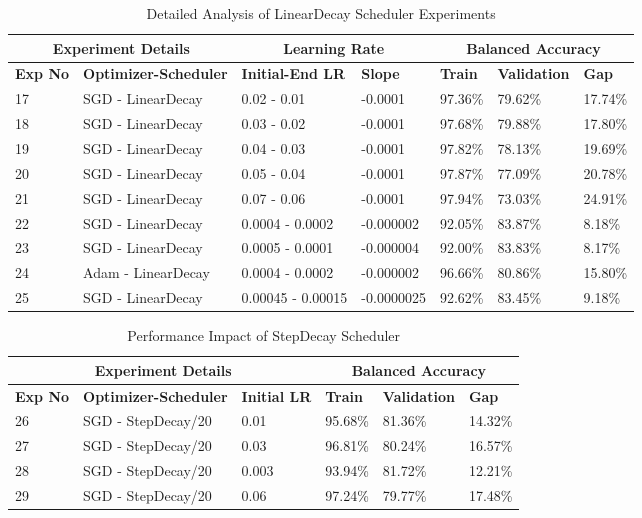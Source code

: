 \begin{table}[t]
\caption{Detailed Analysis of LinearDecay Scheduler Experiments}
\label{table:lineadecay-detailed}
\begin{center}
\small
\begin{tabular}{lllllll}
\multicolumn{2}{c}{\bf{Experiment Details}} & \multicolumn{2}{c}{\bf{Learning Rate}} & \multicolumn{3}{c}{\bf{Balanced Accuracy}} \\
\hline
\bf{Exp No} & \bf{Optimizer-Scheduler} & \bf{Initial-End LR} & \bf{Slope} & \bf{Train} & \bf{Validation} & \bf{Gap} \\
\hline
17 & SGD - LinearDecay & 0.02 - 0.01 & -0.0001 & 97.36\% & 79.62\% & 17.74\% \\
18 & SGD - LinearDecay & 0.03 - 0.02 & -0.0001 & 97.68\% & 79.88\% & 17.80\% \\
19 & SGD - LinearDecay & 0.04 - 0.03 & -0.0001 & 97.82\% & 78.13\% & 19.69\% \\
20 & SGD - LinearDecay & 0.05 - 0.04 & -0.0001 & 97.87\% & 77.09\% & 20.78\% \\
21 & SGD - LinearDecay & 0.07 - 0.06 & -0.0001 & 97.94\% & 73.03\% & 24.91\% \\
22 & SGD - LinearDecay & 0.0004 - 0.0002 & -0.000002 & 92.05\% & 83.87\% & 8.18\% \\
23 & SGD - LinearDecay & 0.0005 - 0.0001 & -0.000004 & 92.00\% & 83.83\% & 8.17\% \\
24 & Adam - LinearDecay & 0.0004 - 0.0002 & -0.000002 & 96.66\% & 80.86\% & 15.80\% \\
25 & SGD - LinearDecay & 0.00045 - 0.00015 & -0.0000025 & 92.62\% & 83.45\% & 9.18\% \\
\hline
\end{tabular}
\end{center}
\end{table}

\begin{table}[t]
\caption{Performance Impact of StepDecay Scheduler}
\label{table:stepdecay-performance}
\begin{center}
\small
\begin{tabular}{llllll}
\multicolumn{3}{c}{\bf{Experiment Details}} & \multicolumn{3}{c}{\bf{Balanced Accuracy}} \\
\hline
\bf{Exp No} & \bf{Optimizer-Scheduler} & \bf{Initial LR} & \bf{Train} & \bf{Validation} & \bf{Gap} \\
\hline
26 & SGD - StepDecay/20 & 0.01 & 95.68\% & 81.36\% & 14.32\% \\
27 & SGD - StepDecay/20 & 0.03 & 96.81\% & 80.24\% & 16.57\% \\
28 & SGD - StepDecay/20 & 0.003 & 93.94\% & 81.72\% & 12.21\% \\
29 & SGD - StepDecay/20 & 0.06 & 97.24\% & 79.77\% & 17.48\% \\
\hline
\end{tabular}
\end{center}
\end{table}

